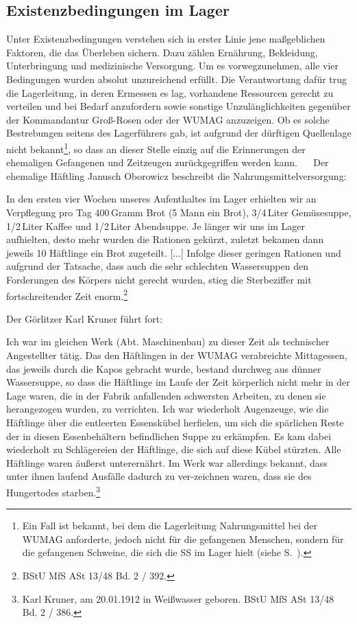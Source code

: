 \documentclass[a4paper,12pt,ngerman,
]{nisebook}
\begin{document}
\subsection{Existenzbedingungen im Lager}
Unter Existenzbedingungen verstehen sich in erster Linie jene maßgeblichen Faktoren, die das Überleben sichern. Dazu zählen Ernährung, Bekleidung, Unterbringung und medizinische Versorgung.
Um es vorwegzunehmen, alle vier Bedingungen wurden absolut unzureichend erfüllt.
Die Verantwortung dafür trug die Lagerleitung, in deren Ermessen es lag, vorhandene Ressourcen gerecht zu verteilen und bei Bedarf anzufordern sowie sonstige Unzulänglichkeiten gegenüber der Kommandantur Groß-Rosen oder der WUMAG anzuzeigen.
Ob es solche Bestrebungen seitens des Lagerführers gab, ist aufgrund der dürftigen Quellenlage nicht bekannt\footnote{Ein Fall ist bekannt, bei dem die Lagerleitung Nahrungsmittel bei der WUMAG anforderte, jedoch nicht für die gefangenen Menschen, sondern für die gefangenen Schweine, die sich die SS im Lager hielt (siehe S.~\pageref{schweine}).}, so dass an dieser Stelle einzig auf die Erinnerungen der ehemaligen Gefangenen und Zeitzeugen zurückgegriffen werden kann.
~
\newline~Der ehemalige Häftling Janusch Oborowicz beschreibt die Nahrungsmittelversorgung:
\begin{leftbar}
In den ersten vier Wochen unseres Aufenthaltes im Lager erhielten wir an Verpflegung pro Tag 400\,Gramm Brot (5 Mann ein Brot), 3/4\,Liter Gemüsesuppe, 1/2\,Liter Kaffee und 1/2\,Liter Abendsuppe. Je länger wir uns im Lager aufhielten, desto mehr wurden die Rationen gekürzt, zuletzt bekamen dann jeweils 10 Häftlinge ein Brot zugeteilt. [...] Infolge dieser geringen Rationen und aufgrund der Tatsache, dass auch die sehr schlechten Wassersuppen den Forderungen des Körpers nicht gerecht wurden, stieg die Sterbeziffer mit fortschreitender Zeit enorm.\footnote{BStU MfS ASt 13/48 Bd. 2 / 392.}\end{leftbar}
\newpage
Der Görlitzer Karl Kruner führt fort:
\begin{leftbar}
Ich war im gleichen Werk (Abt. Maschinenbau) zu dieser Zeit als technischer Angestellter tätig.
Das den Häftlingen in der WUMAG verabreichte Mittagessen, das jeweils durch die Kapos gebracht wurde, bestand durchweg aus dünner Wassersuppe, so dass die Häftlinge im Laufe der Zeit körperlich nicht mehr in der Lage waren, die in der Fabrik anfallenden schwersten Arbeiten, zu denen sie herangezogen wurden, zu verrichten. Ich war wiederholt Augenzeuge, wie die Häftlinge über die entleerten Essenskübel herfielen, um sich die spärlichen Reste der in diesen Essenbehältern befindlichen Suppe zu erkämpfen. Es kam dabei wiederholt zu Schlägereien der Häftlinge, die sich auf diese Kübel stürzten.
Alle Häftlinge waren äußerst unterernährt. Im Werk war allerdings bekannt, dass unter ihnen laufend Ausfälle dadurch zu ver-zeichnen waren, dass sie des Hungertodes starben.\footnote{Karl Kruner, am 20.01.1912 in Weißwasser geboren. BStU MfS ASt 13/48 Bd. 2 / 386.}
\end{leftbar}
\end{document}
